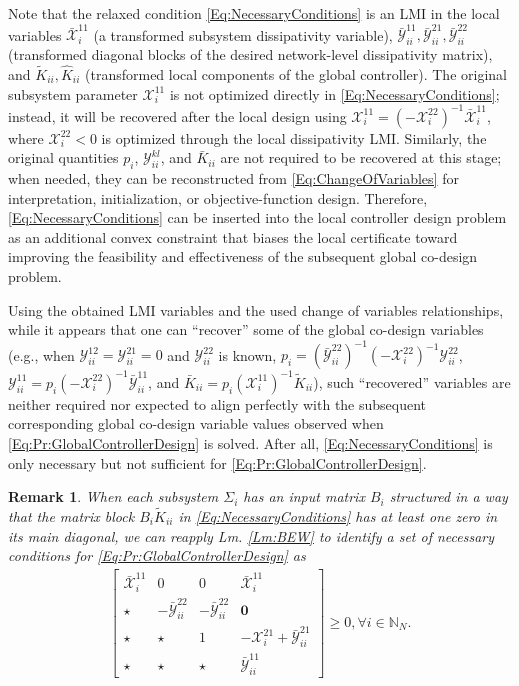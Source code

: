 \documentclass[letterpaper, 10 pt, conference]{ieeeconf}%
\newcommand{\N}{\mathbb{N}}
\newcommand{\0}{\mathbf{0}}
\newcommand{\X}{\mathcal{X}}
\newcommand{\Y}{\mathcal{Y}}
\newcommand{\x}{{\scriptstyle \X}}
\newcommand{\y}{{\scriptstyle \Y}}
\newcommand{\bm}[1]{\begin{bmatrix}#1\end{bmatrix}}
\newtheorem{remark}{\textbf{Remark}}
\begin{document}
Note that the relaxed condition \eqref{Eq:NecessaryConditions} is an LMI in the local variables
$\bar{\x}_i^{11}$ (a transformed subsystem dissipativity variable), $\bar{\y}_{ii}^{11},\bar{\y}_{ii}^{21},\bar{\y}_{ii}^{22}$ (transformed diagonal blocks of the desired network-level dissipativity matrix), and $\tilde K_{ii},\hat K_{ii}$ (transformed local components of the global controller). The original subsystem parameter $\x_i^{11}$ is not optimized directly in \eqref{Eq:NecessaryConditions}; instead, it will be recovered after the local design using $\x_i^{11}=(-\x_i^{22})^{-1}\bar{\x}_i^{11}$, where $\x_i^{22}<0$ is optimized through the local dissipativity LMI. 
Similarly, the original quantities $p_i$, $\Y_{ii}^{kl}$, and $\bar{K}_{ii}$ are not required to be recovered at this stage; when needed, they can be reconstructed from \eqref{Eq:ChangeOfVariables} for interpretation, initialization, or objective-function design. Therefore, \eqref{Eq:NecessaryConditions} can be inserted into the local controller design problem as an additional convex constraint that biases the local certificate toward improving the feasibility and effectiveness of the subsequent global co-design problem.




Using the obtained LMI variables and the used change of variables relationships, while it appears that one can ``recover'' some of the global co-design variables (e.g., when $\y_{ii}^{12}=\y_{ii}^{21}=0$ and $\y_{ii}^{22}$ is known, $p_i = (\bar{\y}_{ii}^{22})^{-1} (-\x_i^{22})^{-1} \y_{ii}^{22}$,
$\y_{ii}^{11} = p_i(-\x_i^{22})^{-1}\bar{\y}_{ii}^{11}$, and 
$\bar{K}_{ii} = p_i(\x_i^{11})^{-1}\tilde{K}_{ii}$), such ``recovered'' variables are neither required nor expected to align perfectly with the subsequent corresponding global co-design variable values observed when \eqref{Eq:Pr:GlobalControllerDesign} is solved. After all, \eqref{Eq:NecessaryConditions} is only necessary but not sufficient for \eqref{Eq:Pr:GlobalControllerDesign}. 


\begin{remark}
When each subsystem $\Sigma_i$ has an input matrix $B_i$ structured in a way that the matrix block $B_i \tilde{K}_{ii}$ in \eqref{Eq:NecessaryConditions} has at least one zero in its main diagonal, we can reapply Lm. \ref{Lm:BEW} to identify a set of necessary conditions for  \eqref{Eq:Pr:GlobalControllerDesign} as
\begin{equation}
\label{Eq:NecessaryConditions3}
\begin{aligned}
\bm{
\bar{\x}_i^{11} & 0 & 0 & \bar{\x}_i^{11} \\
\star & -\bar{\y}^{22}_{ii} & -\bar{\y}^{22}_{ii} & \0 \\ 
\star& \star & 1 & -\x_i^{21}+\bar{\y}^{21}_{ii} \\
\star & \star & \star &  \bar{\y}^{11}_{ii} 
} \geq 0,  
\forall i\in\N_N.
\end{aligned}
\end{equation}
\end{remark}
\end{document}
